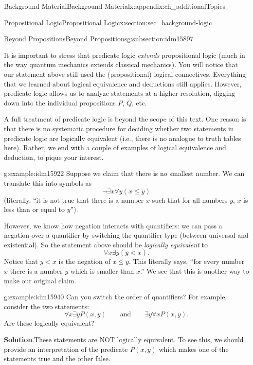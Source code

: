 \documentclass[oneside,10pt,]{book}
\numberwithin{equation}{chapter}
\newcommand{\lt}{<}
\begin{document}
\begin{appendixptx}{Background Material}{}{Background Material}{}{}{x:appendix:ch_additionalTopics}
\begin{sectionptx}{Propositional Logic}{}{Propositional Logic}{}{}{x:section:sec_background-logic}
\begin{subsectionptx}{Beyond Propositions}{}{Beyond Propositions}{}{}{g:subsection:idm15897}
\par
It is important to stress that predicate logic \emph{extends} propositional logic (much in the way quantum mechanics extends classical mechanics).  You will notice that our statement above still used the (propositional) logical connectives.  Everything that we learned about logical equivalence and deductions still applies.  However, predicate logic allows us to analyze statements at a higher resolution, digging down into the individual propositions \(P\), \(Q\), etc.%
\par
A full treatment of predicate logic is beyond the scope of this text.  One reason is that there is no systematic procedure for deciding whether two statements in predicate logic are logically equivalent (i.e., there is no analogue to truth tables here).  Rather, we end with a couple of examples of logical equivalence and deduction, to pique your interest.%
\begin{example}{}{g:example:idm15922}%
Suppose we claim that there is no smallest number.  We can translate this into symbols as%
\begin{equation*}
\neg \exists x \forall y (x \le y)
\end{equation*}
(literally, ``it is not true that there is a number \(x\) such that for all numbers \(y\), \(x\) is less than or equal to \(y\)'').%
\par
However, we know how negation interacts with quantifiers: we can pass a negation over a quantifier by switching the quantifier type (between universal and existential).  So the statement above should be \emph{logically equivalent} to%
\begin{equation*}
\forall x \exists y (y \lt x).
\end{equation*}
Notice that \(y \lt x\) is the negation of \(x \le y\).  This literally says, ``for every number \(x\) there is a number \(y\) which is smaller than \(x\).''  We see that this is another way to make our original claim.%
\end{example}
\begin{example}{}{g:example:idm15940}%
Can you switch the order of quantifiers? For example, consider the two statements:%
\begin{equation*}
\forall x \exists y P(x,y) \qquad \mathrm{ and } \qquad \exists y \forall x P(x,y).
\end{equation*}
Are these logically equivalent?%
\par\smallskip%
\noindent\textbf{Solution}.\hypertarget{g:solution:idm15944}{}\quad{}These statements are NOT logically equivalent. To see this, we should provide an interpretation of the predicate \(P(x,y)\) which makes one of the statements true and the other false.%

\end{example}
\end{subsectionptx}
\end{sectionptx}
\end{appendixptx}
\end{document}
